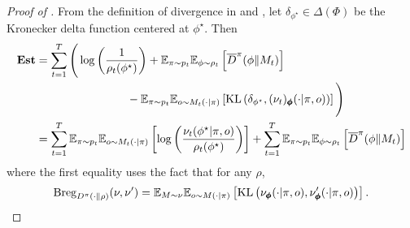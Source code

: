 \begin{proof}[Proof of ]



From the definition of divergence in  and , let $\delta_{\phi^\star}\in\Delta(\Phi)$ be the Kronecker delta function centered at  $\phi^\star$.  Then  
\begin{align}
   \textbf{\textup{Est}}&= \sum_{t=1}^T \Bigg(\log\left(\frac{1}{\rho_t(\phi^\star)}\right) +  \mathbb{E}_{\pi \sim p_t}\mathbb{E}_{\phi\sim \rho_t}\left[\overline{D}^{\pi}(\phi\|M_t)  \right] \nonumber \\
    &\qquad \qquad \qquad \qquad - \mathbb{E}_{\pi \sim p_t}\mathbb{E}_{o \sim M_t(\cdot|\pi)}\left[\text{KL}\left(\delta_{\phi^\star}, (\nu_t)_{\pmb{\phi}}(\cdot|\pi, o)\right) \right]\Bigg)\nonumber
    \\&= \sum_{t=1}^T \mathbb{E}_{\pi \sim p_t}\mathbb{E}_{o \sim M_t(\cdot|\pi)}\left[\log\left(\frac{\nu_t(\phi^\star|\pi, o)}{\rho_t(\phi^\star)}\right)\right] +  \sum_{t=1}^T\mathbb{E}_{\pi \sim p_t}\mathbb{E}_{\phi\sim \rho_t}\left[\overline{D}^{\pi}(\phi\|M_t)\right] \label{eq:est_gen_fir}
\end{align}
where the first equality uses the fact that for any $\rho$, 
\begin{align*}
    \textup{Breg}_{D^{\pi}(\cdot\|\rho)}(\nu, \nu') = \mathbb{E}_{M \sim \nu}\mathbb{E}_{o \sim M(\cdot|\pi)}\left[\text{KL}\left(\nu_{\pmb{\phi}}(\cdot|\pi, o), \nu_{\pmb{\phi}}'(\cdot|\pi, o)\right)\right].
\end{align*}
\end{proof}

